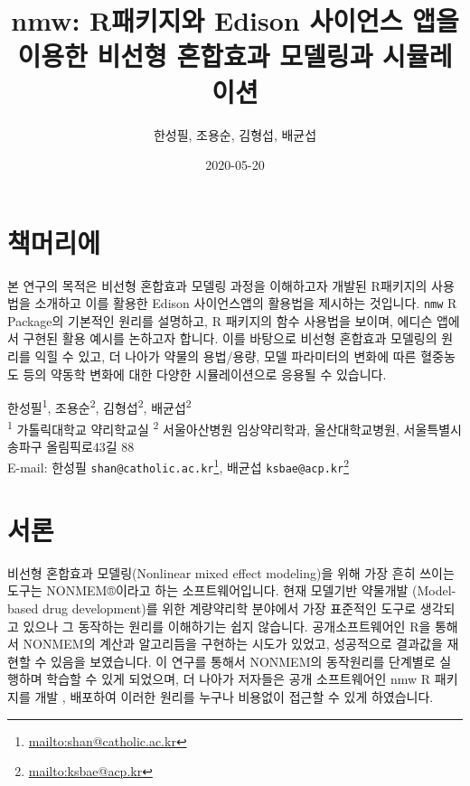 \documentclass[
  12pt,
]{krantz}
\title{nmw: R패키지와 Edison 사이언스 앱을 이용한 비선형 혼합효과 모델링과 시뮬레이션}
\author{한성필, 조용순, 김형섭, 배균섭}
\date{2020-05-20}
\renewcommand{\href}[2]{#2\footnote{\url{#1}}}
\begin{document}
\maketitle

\thispagestyle{empty}
\begin{center}
\end{center}

\setlength{\abovedisplayskip}{-5pt}
\setlength{\abovedisplayshortskip}{-5pt}

{
\hypersetup{linkcolor=}
\setcounter{tocdepth}{2}
\tableofcontents
}
\listoftables
\listoffigures
\hypertarget{uxcc45uxba38uxb9acuxc5d0}{%
\chapter*{책머리에}\label{uxcc45uxba38uxb9acuxc5d0}}


본 연구의 목적은 비선형 혼합효과 모델링 과정을 이해하고자 개발된 R패키지의 사용법을 소개하고 이를 활용한 Edison 사이언스앱의 활용법을 제시하는 것입니다. \texttt{nmw} R Package의 기본적인 원리를 설명하고, R 패키지의 함수 사용법을 보이며, 에디슨 앱에서 구현된 활용 예시를 논하고자 합니다. 이를 바탕으로 비선형 혼합효과 모델링의 원리를 익힐 수 있고, 더 나아가 약물의 용법/용량, 모델 파라미터의 변화에 따른 혈중농도 등의 약동학 변화에 대한 다양한 시뮬레이션으로 응용될 수 있습니다.

한성필\textsuperscript{1}, 조용순\textsuperscript{2}, 김형섭\textsuperscript{2}, 배균섭\textsuperscript{2}\\
\textsuperscript{1} 가톨릭대학교 약리학교실
\textsuperscript{2} 서울아산병원 임상약리학과, 울산대학교병원, 서울특별시 송파구 올림픽로43길 88\\
E-mail: 한성필 \href{mailto:shan@catholic.ac.kr}{\nolinkurl{shan@catholic.ac.kr}}, 배균섭 \href{mailto:ksbae@acp.kr}{\nolinkurl{ksbae@acp.kr}}

\mainmatter

\hypertarget{intro}{%
\chapter{서론}\label{intro}}

비선형 혼합효과 모델링(Nonlinear mixed effect modeling)을 위해 가장 흔히 쓰이는 도구는 NONMEM®이라고 하는 소프트웨어입니다. 현재 모델기반 약물개발 (Model-based drug development)를 위한 계량약리학 분야에서 가장 표준적인 도구로 생각되고 있으나 그 동작하는 원리를 이해하기는 쉽지 않습니다. 공개소프트웨어인 R을 통해서 NONMEM의 계산과 알고리듬을 구현하는 시도가 있었고, 성공적으로 결과값을 재현할 수 있음을 보였습니다. \citep{kim2015r, bae2016r} 이 연구를 통해서 NONMEM의 동작원리를 단계별로 실행하며 학습할 수 있게 되었으며, 더 나아가 저자들은 공개 소프트웨어인 nmw R 패키지를 개발 \citep{R-nmw}, 배포하여 이러한 원리를 누구나 비용없이 접근할 수 있게 하였습니다.
\end{document}

